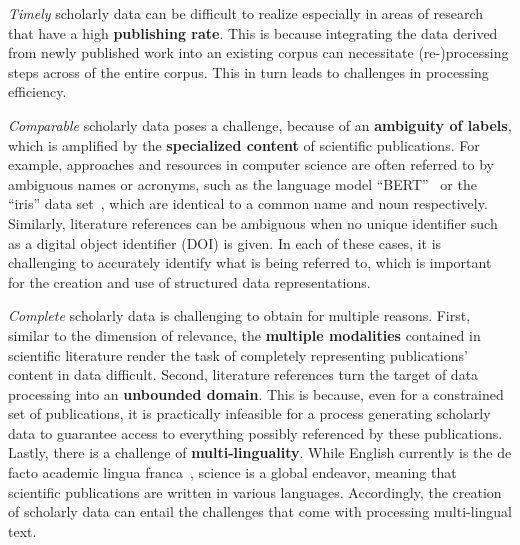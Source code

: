 \textit{Timely} scholarly data can be difficult to realize especially in areas of research that have a high \textbf{publishing rate}. This is because integrating the data derived from newly published work into an existing corpus can necessitate (re-)processing steps across of the entire corpus. This in turn leads to challenges in processing efficiency.

\textit{Comparable} scholarly data poses a challenge, because of an \textbf{ambiguity of labels}, which is amplified by the \textbf{specialized content} of scientific publications. For example, approaches and resources in computer science are often referred to by ambiguous names or acronyms, such as the language model ``BERT''~\cite{devlin2019} or the ``iris'' data set~\cite{Fisher1936}, which are identical to a common name and noun respectively. Similarly, literature references can be ambiguous when no unique identifier such as a digital object identifier (DOI) is given. In each of these cases, it is challenging to accurately identify what is being referred to, which is important for the creation and use of structured data representations.

\textit{Complete} scholarly data is challenging to obtain for multiple reasons. First, similar to the dimension of relevance, the \textbf{multiple modalities} contained in scientific literature render the task of completely representing publications' content in data difficult. Second, literature references turn the target of data processing into an \textbf{unbounded domain}. This is because, even for a constrained set of publications, it is practically infeasible for a process generating scholarly data to guarantee access to everything possibly referenced by these publications. Lastly, there is a challenge of \textbf{multi-linguality}. While English currently is the de facto academic lingua franca~\cite{Montgomery2013}, science is a global endeavor, meaning that scientific publications are written in various languages. Accordingly, the creation of scholarly data can entail the challenges that come with processing multi-lingual text.
 

